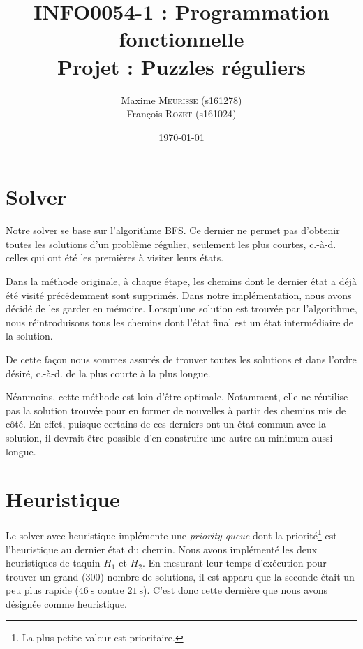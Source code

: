 \documentclass[a4paper, 11pt]{article}
\title{\textbf{\textsc{INFO0054-1} : Programmation fonctionnelle}\\Projet : Puzzles réguliers}
\author{Maxime \textsc{Meurisse} (s161278)\\François \textsc{Rozet} (s161024)\\}
\date{\today}
\begin{document}
    \maketitle
    \section{Solver}
    Notre solver se base sur l'algorithme BFS. Ce dernier ne permet pas d'obtenir toutes les solutions d'un problème régulier, seulement les plus courtes, c.-à-d. celles qui ont été les \og{}premières\fg{} à visiter leurs états. \par
    Dans la méthode originale, à chaque étape, les chemins dont le dernier état a déjà été visité précédemment sont supprimés. Dans notre implémentation, nous avons décidé de les garder en mémoire. Lorsqu'une solution est trouvée par l'algorithme, nous réintroduisons tous les chemins dont l'état final est un état intermédiaire de la solution. \par
    De cette façon nous sommes assurés de trouver toutes les solutions et dans l'ordre désiré, c.-à-d. de la plus courte à la plus longue. \par
    Néanmoins, cette méthode est loin d'être optimale. Notamment, elle ne réutilise pas la solution trouvée pour en former de nouvelles à partir des chemins mis de côté. En effet, puisque certains de ces derniers ont un état commun avec la solution, il devrait être possible d'en construire une autre au minimum aussi longue.
    \setcounter{section}{2}
    \section{Heuristique}
    Le solver \og{}avec heuristique\fg{} implémente une \emph{priority queue} dont la priorité\footnote{La plus petite valeur est prioritaire.} est l'heuristique au dernier état du chemin.
    Nous avons implémenté les deux heuristiques de taquin $H_1$ et $H_2$. En mesurant leur temps d'exécution pour trouver un grand ($\num{300}$) nombre de solutions, il est apparu que la seconde était un peu plus rapide ($\SI{46}{\second}$ contre $\SI{21}{\second}$). C'est donc cette dernière que nous avons désignée comme heuristique.
\end{document}
